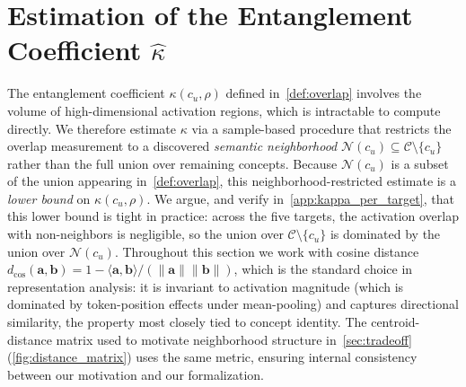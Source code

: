 \section{Estimation of the Entanglement Coefficient $\hat\kappa$}
\label{app:kappa_estimation}

The entanglement coefficient $\kappa(c_u, \rho)$ defined in~\cref{def:overlap} involves the volume of high-dimensional activation regions, which is intractable to compute directly. We therefore estimate $\kappa$ via a sample-based procedure that restricts the overlap measurement to a discovered \emph{semantic neighborhood} $\mathcal{N}(c_u) \subseteq \mathcal{C} \setminus \{c_u\}$ rather than the full union over remaining concepts. Because $\mathcal{N}(c_u)$ is a subset of the union appearing in~\cref{def:overlap}, this neighborhood-restricted estimate is a \emph{lower bound} on $\kappa(c_u, \rho)$. 
We argue, and verify in~\cref{app:kappa_per_target}, that this lower bound is tight in practice: across the five targets, the activation overlap with non-neighbors is negligible, so the union over $\mathcal{C} \setminus \{c_u\}$ is dominated by the union over $\mathcal{N}(c_u)$. 
Throughout this section we work with cosine distance $d_{\cos}(\mathbf{a}, \mathbf{b}) = 1 - \langle \mathbf{a}, \mathbf{b} \rangle / (\|\mathbf{a}\|\|\mathbf{b}\|)$, which is the standard choice in representation analysis: it is invariant to activation magnitude (which is dominated by token-position effects under mean-pooling) and captures directional similarity, the property most closely tied to concept identity. 
The centroid-distance matrix used to motivate neighborhood structure in~\cref{sec:tradeoff} (\cref{fig:distance_matrix}) uses the same metric, ensuring internal consistency between our motivation and our formalization.


